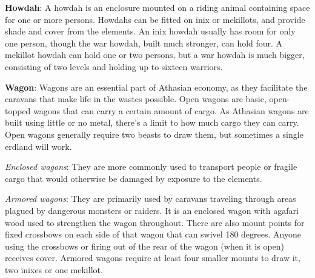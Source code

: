 \textbf{Howdah}: A howdah is an enclosure mounted on a riding animal containing space for one or more persons. Howdahs can be fitted on inix or mekillots, and provide shade and cover from the elements. An inix howdah usually has room for only one person, though the war howdah, built much stronger, can hold four. A mekillot howdah can hold one or two persons, but a war howdah is much bigger, consisting of two levels and holding up to sixteen warriors.

\textbf{Wagon}: Wagons are an essential part of Athasian economy, as they facilitate the caravans that make life in the wastes possible. Open wagons are basic, open-topped wagons that can carry a certain amount of cargo. As Athasian wagons are built using little or no metal, there's a limit to how much cargo they can carry. Open wagons generally require two beasts to draw them, but sometimes a single erdland will work.

\textit{Enclosed wagons}: They are more commonly used to transport people or fragile cargo that would otherwise be damaged by exposure to the elements.

\textit{Armored wagons}: They are primarily used by caravans traveling through areas plagued by dangerous monsters or raiders. It is an enclosed wagon with agafari wood used to strengthen the wagon throughout. There are also mount points for fixed crossbows on each side of that wagon that can swivel 180 degrees. Anyone using the crossbows or firing out of the rear of the wagon (when it is open) receives cover. Armored wagons require at least four smaller mounts to draw it, two inixes or one mekillot.
